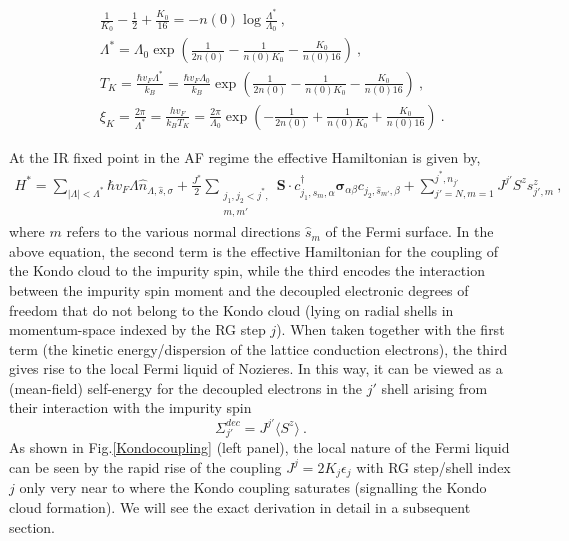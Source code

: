 \documentclass[aps,prb,preprint,groupedaddress]{revtex4-2}
\begin{document}
\begin{eqnarray}
&&\frac{1}{K_{0}}-\frac{1}{2}+\frac{K_{0}}{16}=-n(0)\log\frac{\Lambda^{*}}{\Lambda_{0}}~,\\
&&\Lambda^{*}=\Lambda_{0}\exp\left(\frac{1}{2n(0)}-\frac{1}{n(0)K_{0}}-\frac{K_{0}}{n(0)16}\right)~,\label{gap function}\\
&&T_{K} = \frac{\hbar v_{F}\Lambda^{*}}{k_{B}}= \frac{\hbar v_{F}\Lambda_{0}}{k_{B}}\exp\left(\frac{1}{2n(0)}-\frac{1}{n(0)K_{0}}-\frac{K_{0}}{n(0)16}\right)~,\label{KondoTemp}\\
&&\xi_{K} = \frac{2\pi}{\Lambda^{*}} = \frac{h v_{F}}{k_{B}T_{K}} = \frac{2\pi}{\Lambda_{0}}\exp\left(-\frac{1}{2n(0)}+\frac{1}{n(0)K_{0}}+\frac{K_{0}}{n(0)16}\right)~.\label{KSlength}
\end{eqnarray}
\par\noindent
At the IR fixed point in the AF regime the effective Hamiltonian is given by,
\begin{eqnarray}
H^{*}=\sum_{|\Lambda|<\Lambda^{*}}\hbar v_{F}\Lambda\hat{n}_{\Lambda,\hat{s},\sigma}+\frac{J^{*}}{2}\sum_{\substack{j_{1},j_{2}<j^{*},\\ m,m'}}\mathbf{S}\cdot c^{\dagger}_{j_{1},\hat{s}_{m},\alpha}\boldsymbol{\sigma}_{\alpha\beta}c_{j_{2},\hat{s}_{m'},\beta}+\sum_{j'=N,m=1}^{j^{*},n_{j'}}J^{j'}S^{z}s^{z}_{j',m}~,\label{fixedPointHam}
\end{eqnarray} 
where $m$ refers to the various normal directions $\hat{s}_{m}$ of the Fermi surface. In the above equation, the second term is the effective Hamiltonian for the coupling of the Kondo cloud to the impurity spin, while the third encodes the interaction between the impurity spin moment and the decoupled electronic degrees of freedom that do not belong to the Kondo cloud (lying on radial shells in momentum-space indexed by the RG step $j$). When taken together with the first term (the kinetic energy/dispersion of the lattice conduction electrons), the third gives rise to the local Fermi liquid of Nozieres. In this way, it can be viewed as a (mean-field) self-energy for the decoupled electrons in the $j'$ shell arising from their interaction with the impurity spin
\begin{equation}
\Sigma^{dec}_{j'} = J^{j'}\langle S^{z}\rangle~.  
\end{equation}
As shown in Fig.\ref{Kondocoupling} (left panel), the local nature of the Fermi liquid can be seen by the rapid rise of the coupling $J^{j}=2K_{j}\epsilon_{j}$ with RG step/shell index $j$ only very near to where the Kondo coupling saturates (signalling the Kondo cloud formation). We will see the exact derivation in detail in a subsequent section.
\end{document}
